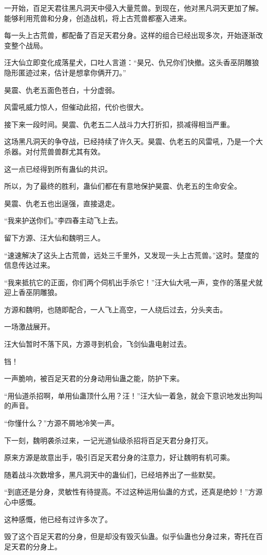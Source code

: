 \begin{this_body}
一开始，百足天君往黑凡洞天中侵入大量荒兽。到现在，他对黑凡洞天更加了解。能够利用荒兽和分身，创造战机，将上古荒兽都塞入进来。

每一头上古荒兽，都配备了百足天君分身。这样的组合已经出现多次，开始逐渐改变整个战局。

汪大仙立即变化成落星犬，口吐人言道：“昊兄、仇兄你们快撤。这头香巫阴雕狼隐形匿迹过来，估计是想拿你俩开刀。”

昊震、仇老五面色苍白，十分虚弱。

风雷吼威力惊人，但催动此招，代价也很大。

接下来一段时间。昊震、仇老五二人战斗力大打折扣，损减得相当严重。

这场黑凡洞天的争夺战，已经持续了许久天。昊震、仇老五的风雷吼，乃是一个大杀器。对付荒兽兽群尤其有效。

这一点已经得到所有蛊仙的共识。

所以，为了最终的胜利，蛊仙们都在有意地保护昊震、仇老五的生命安全。

昊震、仇老五也出逞强，直接退走。

“我来护送你们。”李四春主动飞上去。

留下方源、汪大仙和魏明三人。

“速速解决了这头上古荒兽，远处三千里外，又发现一头上古荒兽。”这时。楚度的信息传达过来。

“我来抵抗它的正面，你们两个伺机出手杀它！”汪大仙大吼一声，变作的落星犬就迎上香巫阴雕狼。

方源和魏明，也随即配合，一人飞上高空，一人绕后过去，分头夹击。

一场激战展开。

汪大仙暂时不落下风，方源寻到机会，飞剑仙蛊电射过去。

铛！

一声脆响，被百足天君的分身动用仙蛊之能，防护下来。

“用仙道杀招啊，单用仙蛊顶什么用？汪！”汪大仙一着急，就会下意识地发出狗叫的声音。

“你懂什么？”方源不屑地冷笑一声。

下一刻，魏明袭杀过来，一记光道仙级杀招将百足天君分身打灭。

原来方源是故意出手，吸引百足天君分身的注意力，好让魏明有机可乘。

随着战斗次数增多，黑凡洞天中的蛊仙们，已经培养出了一些默契。

“到底还是分身，灵敏性有待提高。不过这种运用仙蛊的方式，还真是绝妙！”方源心中感慨。

这种感慨，他已经有过许多次了。

毁了这个百足天君的分身，但是却没有毁灭仙蛊。似乎仙蛊也分身过来，寄托在百足天君的分身上。


\end{this_body}
